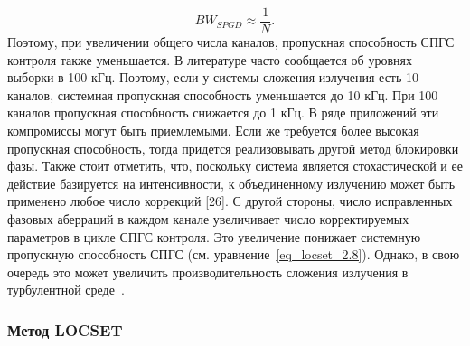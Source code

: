 \begin{equation}\label{eq_locset_2.8}
  BW_{SPGD}\approx\frac{1}{N}.
\end{equation}
Поэтому, при увеличении общего числа каналов, пропускная способность СПГС контроля также уменьшается. В литературе часто сообщается об уровнях выборки в 100 кГц. Поэтому, если у системы сложения излучения есть 10 каналов, системная пропускная способность уменьшается до 10 кГц. При 100 каналов пропускная способность снижается до 1 кГц. В ряде приложений эти компромиссы могут быть приемлемыми. Если же требуется более высокая пропускная способность, тогда придется реализовывать другой метод блокировки фазы. Также стоит отметить, что, поскольку система является стохастической и ее действие базируется на интенсивности, к объединенному  излучению может быть применено любое число коррекций [26]. С другой стороны, число исправленных фазовых аберраций в каждом канале увеличивает число корректируемых параметров в цикле СПГС контроля. Это увеличение  понижает системную пропускную способность СПГС (см. уравнение~\eqref{eq_locset_2.8}). Однако, в свою очередь это может увеличить производительность сложения излучения в турбулентной среде~\cite{Locset26}.

\subsubsection{Метод LOCSET}

